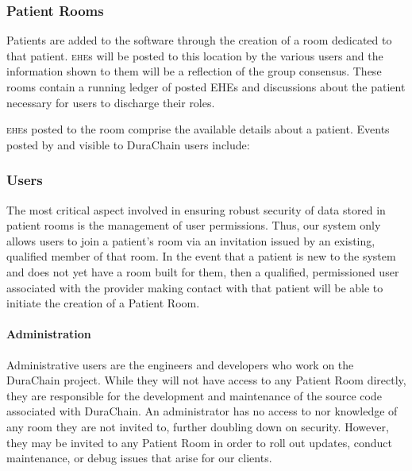   \subsubsection{Patient Rooms}
  Patients are added to the software through the creation of a room dedicated to that patient. \textsc{ehe}s will be posted to this location by the various users and the information shown to them will be a reflection of the group consensus. These rooms contain a running ledger of posted EHEs and discussions about the patient necessary for users to discharge their roles.%

  \textsc{ehe}s posted to the room comprise the available details about a patient. Events posted by and visible to DuraChain users include:%



  \subsubsection{Users}
  The most critical aspect involved in ensuring robust security of data stored in patient rooms is the management of user permissions. Thus, our system only allows users to join a patient's room via an invitation issued by an existing, qualified member of that room. In the event that a patient is new to the system and does not yet have a room built for them, then a qualified, permissioned user associated with the provider making contact with that patient will be able to initiate the creation of a Patient Room.%

  \paragraph{Administration}
  Administrative users are the engineers and developers who work on the DuraChain project. While they will not have access to any Patient Room directly, they are responsible for the development and maintenance of the source code associated with DuraChain. An administrator has no access to nor knowledge of any room they are not invited to, further doubling down on security. However, they may be invited to any Patient Room in order to roll out updates, conduct maintenance, or debug issues that arise for our clients.%


